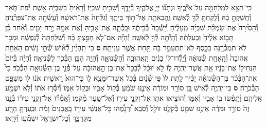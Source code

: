 \documentclass[twoside, openany, parskip=half, 11pt]{book}
\begin{document}
\begin{footnotesize}
\begin{multicols}{2}
\\
כִּֽי־תֵצֵ֥א לַמִּלְחָמָ֖ה עַל־אֹֽיְ֯בֶ֑יךָ וּנְתָנ֞וֹ יְיָ֧ אֱלֹהֶ֛יךָ בְּ֯יָדֶ֖ךָ וְ֯שָׁבִ֥יתָ שִׁבְיֽוֹ׃ וְ֯רָאִ֨יתָ֙ בַּשִּׁבְיָ֔ה אֵ֖שֶׁת יְ֯פַת־תֹּ֑אַר וְ֯חָֽשַׁקְתָּ֣ בָ֔הּ וְ֯לָֽקַחְתָּ֥ לְ֯ךָ֖ לְ֯אִשָּֽׁה׃ וַֽהֲבֵאתָ֖הּ אֶל־תּ֣וֹךְ בֵּיתֶ֑ךָ וְ֯גִלְּ֯חָה֙ אֶת־רֹאשָׁ֔הּ וְ֯עָֽשְׂ֯תָ֖ה אֶת־צִפָּרְ֯נֶֽיהָ׃ וְ֯הֵסִ֩ירָה֩ אֶת־שִׂמְלַ֨ת שִׁבְיָ֜הּ מֵֽעָלֶ֗יהָ וְ֯יָֽשְׁ֯בָה֙ בְּ֯בֵיתֶ֔ךָ וּבָֽכְ֯תָ֛ה אֶת־אָבִ֥יהָ וְ֯אֶת־אִמָּ֖הּ יֶ֣רַח יָמִ֑ים וְ֯אַ֨חַר כֵּ֜ן תָּב֤וֹא אֵלֶ֨יהָ֙ וּֽבְעַלְתָּ֔הּ וְ֯הָֽיְ֯תָ֥ה לְ֯ךָ֖ לְ֯אִשָּֽׁה׃ וְ֯הָיָ֞ה אִם־לֹ֧א חָפַ֣צְתָּ בָּ֗הּ וְ֯שִׁלַּחְתָּהּ֙ לְ֯נַפְשָׁ֔הּ וּמָכֹ֥ר לֹֽא־תִמְכְּ֯רֶ֖נָּה בַּכָּ֑סֶף לֹֽא־תִתְעַמֵּ֣ר בָּ֔הּ תַּ֖חַת אֲשֶׁ֥ר עִנִּיתָֽהּ׃ \textbf{ס}
כִּי־תִֽהְיֶ֨יןָ לְ֯אִ֜ישׁ שְׁ֯תֵּ֣י נָשִׁ֗ים הָֽאַחַ֤ת אֲהוּבָה֙ וְ֯הָֽאַחַ֣ת שְׂ֯נוּאָ֔ה וְ֯יָֽלְ֯דוּ־ל֣וֹ בָנִ֔ים הָֽאֲהוּבָ֖ה וְ֯הַשְּׂ֯נוּאָ֑ה וְ֯הָיָ֛ה הַבֵּ֥ן הַבְּ֯כֹ֖ר לַשְּׂ֯נִיאָֽה׃ וְ֯הָיָ֗ה בְּ֯יוֹם֙ הַנְחִיל֣וֹ אֶת־בָּנָ֔יו אֵ֥ת אֲשֶׁר־יִֽהְיֶ֖ה ל֑וֹ לֹ֣א יוּכַ֗ל לְ֯בַכֵּר֙ אֶת־בֶּן־הָ֣אֲהוּבָ֔ה עַל־פְּ֯נֵ֥י בֶן־הַשְּׂ֯נוּאָ֖ה הַבְּ֯כֹֽר׃ כִּי֩ אֶת־הַבְּ֯כֹ֨ר בֶּן־הַשְּׂ֯נוּאָ֜ה יַכִּ֗יר לָ֤תֶת לוֹ֙ פִּ֣י שְׁ֯נַ֔יִם בְּ֯כֹ֥ל אֲשֶׁר־יִמָּצֵ֖א ל֑וֹ כִּי־הוּא֙ רֵאשִׁ֣ית אֹנ֔וֹ ל֖וֹ מִשְׁפַּ֥ט הַבְּ֯כֹרָֽה׃ \textbf{ס}
כִּי־יִֽהְיֶ֣ה לְ֯אִ֗ישׁ בֵּ֚ן סוֹרֵ֣ר וּמוֹרֶ֔ה אֵינֶ֣נּוּ שֹׁמֵ֔עַ בְּ֯ק֥וֹל אָבִ֖יו וּבְק֣וֹל אִמּ֑וֹ וְ֯יִסְּ֯ר֣וּ אֹת֔וֹ וְ֯לֹ֥א יִשְׁמַ֖ע אֲלֵיהֶֽם׃ וְ֯תָ֥פְ֯שׂוּ ב֖וֹ אָבִ֣יו וְ֯אִמּ֑וֹ וְ֯הוֹצִ֧יאוּ אֹת֛וֹ אֶל־זִקְנֵ֥י עִיר֖וֹ וְ֯אֶל־שַׁ֥עַר מְ֯קֹמֽוֹ׃ וְ֯אָֽמְ֯ר֞וּ אֶל־זִקְנֵ֣י עִיר֗וֹ בְּ֯נֵ֤נוּ זֶה֙ סוֹרֵ֣ר וּמֹרֶ֔ה אֵינֶ֥נּוּ שֹׁמֵ֖עַ בְּ֯קֹלֵ֑נוּ זוֹלֵ֖ל וְ֯סֹבֵֽא׃ וּ֠רְגָמֻ֠הוּ כׇּל־אַנְשֵׁ֨י עִיר֤וֹ בָֽאֲבָנִים֙ וָמֵ֔ת וּבִֽעַרְתָּ֥ הָרָ֖ע מִקִּרְבֶּ֑ךָ וְ֯כׇל־יִשְׂרָאֵ֖ל יִשְׁמְ֯ע֥וּ וְ֯יִרָֽאוּ׃


\end{multicols}
\end{footnotesize}
\end{document}
